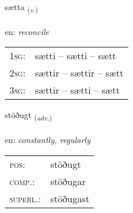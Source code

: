 \documentclass[frontgrid, backgrid]{flacards}\usepackage[]{graphicx}\usepackage[]{color}
\begin{document}
\renewcommand{\flhead}{\vskip5pt \fboxsep=0pt {\small\bfseries\footnotesize Sagnorð | Verb}}
\renewcommand{\fcfoot}{\vskip5pt \fboxsep=0pt \hspace{2pt}{\small\bfseries\footnotesize 2K}}

\renewcommand{\blhead}{\vskip5pt {\small\bfseries\footnotesize Sagnorð | Verb }}
\renewcommand{\bcfoot}{\vskip5pt \hspace{2pt}{\small\bfseries\footnotesize 2K}}


{sætta \small{\textsubscript{(\textit{v.})}} \\[1ex] %
\textphonetic{[saihta]} \\
en: \emph{reconcile} \\  [2ex]
\renewcommand*{\arraystretch}{0.8}
\begin{tabular}{p{1cm}l}
\textsc{1sg}: & sætti -- sætti -- sætt \\ 
\textsc{2sg}: & sættir -- sættir -- sætt \\ 
\textsc{3sg}: & sættir -- sætti -- sætt \\ 
\end{tabular}
}

\renewcommand{\flhead}{\vskip5pt \fboxsep=0pt {\small\bfseries\footnotesize Atviksorð | Adverb}}
\renewcommand{\fcfoot}{\vskip5pt \fboxsep=0pt \hspace{2pt}{\small\bfseries\footnotesize 2K}}

\renewcommand{\blhead}{\vskip5pt {\small\bfseries\footnotesize Atviksorð | Adverb }}
\renewcommand{\bcfoot}{\vskip5pt \hspace{2pt}{\small\bfseries\footnotesize 2K}}


{stöðugt \small{\textsubscript{(\textit{adv.})}} \\[1ex] %
\textphonetic{[stœːðʏxt]} \\
en: \emph{constantly, regularly} \\  [2ex]
\renewcommand*{\arraystretch}{0.8}
\begin{tabular}{ll}
\textsc{pos}: & stöðugt \\ 
\textsc{comp.}: & stöðugar \\ 
\textsc{superl.}: & stöðugast \\
\end{tabular}
}
\end{document}
